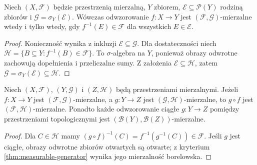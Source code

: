 \begin{twierdzenie}
\label{thm:measurable-generator}
Niech $(X,\mathcal F)$ będzie przestrzenią mierzalną, $Y$ zbiorem,
$\mathcal E\subseteq\mathcal P(Y)$ rodziną zbiorów i
$\mathcal G=\sigma_Y(\mathcal E)$. Wówczas odwzorowanie
$f:X\to Y$ jest $(\mathcal F,\mathcal G)$-mierzalne wtedy i tylko
wtedy, gdy $f^{-1}(E)\in\mathcal F$ dla wszystkich $E\in\mathcal E$.
\end{twierdzenie}
\begin{proof}
Konieczność wynika z inkluzji $\mathcal E\subseteq\mathcal G$.
Dla dostateczności niech
$\mathcal H=\{B\subseteq Y:f^{-1}(B)\in\mathcal F\}$.
To $\sigma$-algebra na $Y$, ponieważ obrazy odwrotne zachowują
dopełnienia i przeliczalne sumy. Z założenia
$\mathcal E\subseteq\mathcal H$, zatem
$\mathcal G=\sigma_Y(\mathcal E)\subseteq\mathcal H$.
\end{proof}

\begin{twierdzenie}
\label{thm:composition-measurable}
Niech $(X,\mathcal F)$, $(Y,\mathcal G)$ i $(Z,\mathcal H)$
będą przestrzeniami mierzalnymi. Jeżeli $f:X\to Y$ jest
$(\mathcal F,\mathcal G)$-mierzalne, a $g:Y\to Z$ jest
$(\mathcal G,\mathcal H)$-mierzalne, to $g\circ f$ jest
$(\mathcal F,\mathcal H)$-mierzalne.
Ponadto każde odwzorowanie ciągłe $g:Y\to Z$ pomiędzy
przestrzeniami topologicznymi jest
$(\mathcal B(Y),\mathcal B(Z))$-mierzalne.
\end{twierdzenie}
\begin{proof}
Dla $C\in\mathcal H$ mamy
$(g\circ f)^{-1}(C)=f^{-1}(g^{-1}(C))\in\mathcal F$.
Jeśli $g$ jest ciągłe, obrazy odwrotne zbiorów otwartych są otwarte;
z kryterium \ref{thm:measurable-generator} wynika jego mierzalność
borelowska.
\end{proof}

